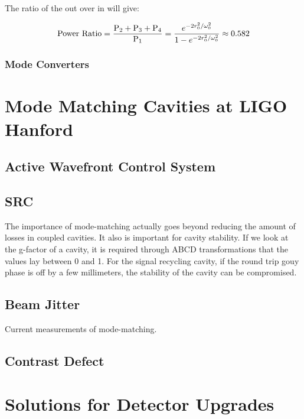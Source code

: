 \documentclass[oneside]{book}
\begin{document}
		The ratio of the out over in will give:
		
		\begin{equation}
		\text{Power Ratio} = \frac{\text{P}_2 + \text{P}_3 + \text{P}_4}{\text{P}_1}  \\
		= \frac{e^{-2r_0^2/ \omega_{0}^2}} {1 - e^{-2r_0^2/ \omega_{0}^2 }} \approx 0.582
		\end{equation}
		
		\subsection{Mode Converters}
		
		
		

\chapter{Mode Matching Cavities at LIGO Hanford}

	\section{Active Wavefront Control System}
	
	\section{SRC}
	The importance of mode-matching actually goes beyond reducing the amount of losses in coupled cavities.  It also is important for cavity stability.  If we look at the g-factor of a cavity, it is required through ABCD transformations that the values lay between 0 and 1.  For the signal recycling cavity, if the round trip gouy phase is off by a few millimeters, the stability of the cavity can be compromised. 
	
	
	\section{Beam Jitter}
	
	Current measurements of mode-matching.
	
	\section{Contrast Defect}


\chapter{Solutions for Detector Upgrades} 
\end{document}
